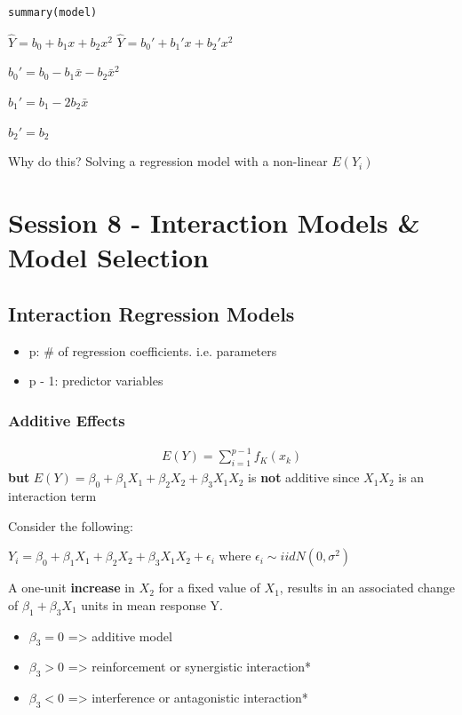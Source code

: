 \documentclass[11pt]{article}
\begin{document}
\begin{verbatim}
summary(model)
\end{verbatim}

\(\hat{Y} =  b_0 + b_1 x + b_2 x^2\)
\(\hat{Y} =  b_0' + b_1' x + b_2' x^2\)

\(b_0' = b_0 - b_1 \bar{x} - b_2 \bar{x}^2\)

\(b_1' = b_1 - 2 b_2 \bar{x}\)

\(b_2' = b_2\)

Why do this? Solving a regression model with a non-linear \(E(Y_i)\)
\section{Session 8 - Interaction Models \& Model Selection}
\label{sec:orgdb781e0}
\subsection{Interaction Regression Models}
\label{sec:org5a9fbbf}
\begin{itemize}
\item p: \# of regression coefficients. i.e. parameters
\item p - 1: predictor variables
\end{itemize}

\subsubsection{Additive Effects}
\label{sec:orge8f9dbf}
\begin{equation}
\begin{split}
E(Y) = \sum_{i = 1}^{p - 1} f_K(x_k)
\end{split}
\end{equation}
\textbf{but} \(E(Y) = \beta_0 + \beta_1 X_1 + \beta_2 X_2 + \beta_3 X_1 X_2\) is \textbf{not}
 additive since \(X_1 X_2\) is an interaction term

Consider the following:

\(Y_i = \beta_0 + \beta_1 X_1 + \beta_2 X_2 + \beta_3 X_1 X_2 + \epsilon_i\) where
\(\epsilon_i \sim iid N(0, \sigma^2)\)

A one-unit \textbf{increase} in \(X_2\) for a fixed value of \(X_1\), results in an
associated change of \(\beta_1 + \beta_3 X_1\) units in mean response Y.

\begin{itemize}
\item \(\beta_3 = 0\) => additive model
\item \(\beta_3 > 0\) => reinforcement or synergistic interaction*
\item \(\beta_3 < 0\) => interference or antagonistic interaction*
\end{itemize}
\end{document}

